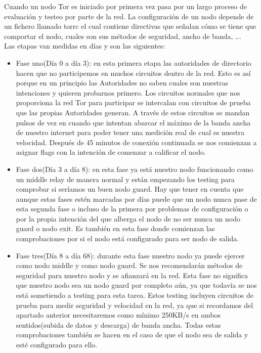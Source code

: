 Cuando un nodo Tor es iniciado por primera vez pasa por un largo proceso de evaluación y testeo por parte de la red. La configuración de un nodo depende de un fichero llamado torrc el cual contiene directivas que señalan cómo se tiene que comportar el nodo, cuales son sus métodos de seguridad, ancho de banda, ...\\
Las etapas van medidas en días y son las siguientes:
\begin{itemize}
	\item Fase uno(Día 0 a día 3): en esta primera etapa las autoridades de directorio hacen que no participemos en muchos circuitos dentro de la red. Esto es así porque en un principio las Autoridades no saben cuales son nuestras intenciones y quieren probarnos primero. Los circuitos normales que nos proporciona la red Tor para participar se intercalan con circuitos de prueba que las propias Autoridades generan. A través de estos circuitos se mandan pulsos de vez en cuando que intentan abarcar el máximo de la banda ancha de nuestro internet para poder tener una medición real de cual es nuestra velocidad. Después de 45 minutos de conexión continuada se nos comienzan a asignar flags con la intención de comenzar a calificar el nodo.\\
	\item Fase dos(Día 3 a día 8): en esta fase ya está nuestro nodo funcionando como un middle relay de manera normal y están empezando los testing para comprobar si seríamos un buen nodo guard. Hay que tener en cuenta que aunque estas fases estén marcadas por días puede que un nodo nunca pase de esta segunda fase o incluso de la primera por problemas de configuración o por la propia intención del que alberga el nodo de no ser nunca un nodo guard o nodo exit. Es también en esta fase donde comienzan las comprobaciones por si el nodo está configurado para ser nodo de salida.\\
	\item Fase tres(Día 8 a día 68): durante esta fase nuestro nodo ya puede ejercer como nodo middle y como nodo guard. Se nos recomendarán métodos de seguridad para nuestro nodo y se afianzará en la red. Esta fase no significa que nuestro nodo sea un nodo guard por completo aún, ya que todavía se nos está sometiendo a testing para esta tarea. Estos testing incluyen circuitos de prueba para medir seguridad y velocidad en la red, ya que si recordamos del apartado anterior necesitaremos como mínimo 250KB/s en ambos sentidos(subida de datos y descarga) de banda ancha. Todas estas comprobaciones también se hacen en el caso de que el nodo sea de salida y esté configurado para ello.\\

\end{itemize}
